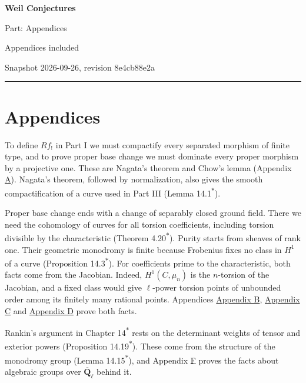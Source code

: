 \documentclass[11pt]{article}
\newcommand{\bpout}[1]{#1\textsuperscript{\hyperlink{bp-outside}{\ensuremath{\ast}}}}
\begin{document}
\pagestyle{plain}
\begin{center}
{\LARGE\bfseries Weil Conjectures\par}
\vspace{0.7em}
{\large Part: Appendices\par}
\vspace{0.5em}
{\small\color{bpmuted}Appendices included\par}
{\small\color{bpmuted}Snapshot 2026-09-26, revision 8e4cb88e2a\par}
\end{center}
\vspace{0.5em}
{\small\tableofcontents}
\bigskip\hrule\bigskip

\part*{\texorpdfstring{Appendices}{Appendices}}
\label{bp1}%
\label{bp2}%
To define \(Rf_!\) in Part I we must compactify every separated morphism of finite type, and to prove proper base change we must dominate every proper morphism by a projective one. These are Nagata's theorem and Chow's lemma (Appendix \hyperref[bp3]{A}). Nagata's theorem, followed by normalization, also gives the smooth compactification of a curve used in Part III (Lemma \bpout{14.1}).

Proper base change ends with a change of separably closed ground field. There we need the cohomology of curves for all torsion coefficients, including torsion divisible by the characteristic (Theorem \bpout{4.20}). Purity starts from sheaves of rank one. Their geometric monodromy is finite because Frobenius fixes no class in \(H^1\) of a curve (Proposition \bpout{14.3}). For coefficients prime to the characteristic, both facts come from the Jacobian. Indeed, \(H^1(C,\mu_n)\) is the \(n\)-torsion of the Jacobian, and a fixed class would give \(\ell\)-power torsion points of unbounded order among its finitely many rational points. Appendices \hyperref[bp75]{Appendix B}, \hyperref[bp119]{Appendix C} and \hyperref[bp172]{Appendix D} prove both facts.

Rankin's argument in Chapter \bpout{14} rests on the determinant weights of tensor and exterior powers (Proposition \bpout{14.19}). These come from the structure of the monodromy group (Lemma \bpout{14.15}), and Appendix \hyperref[bp320]{F} proves the facts about algebraic groups over \(\overline{\mathbf Q}_\ell\) behind it.
\end{document}
